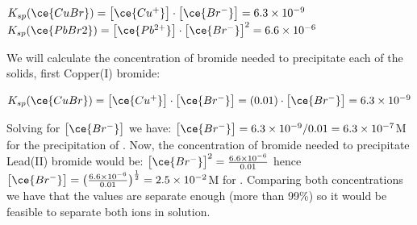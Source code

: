 \documentclass[main.tex]{subfiles}
\begin{document}
\begin{description}
\begin{center}
\hfill $K_{sp}(\ce{CuBr})= \big[ \ce{Cu^{+}} \big]\cdot \big[ \ce{Br^{-}} \big]=6.3\times 10^{-9}$\\
\hfill $K_{sp}(\ce{PbBr2})= \big[ \ce{Pb^{2+}} \big]\cdot \big[ \ce{Br^{-}} \big]^2=6.6\times 10^{-6}$
\end{center}
We will calculate the concentration of bromide needed to precipitate each of the solids, first Copper(I) bromide:
\begin{center}
$K_{sp}(\ce{CuBr})= \big[ \ce{Cu^{+}} \big]\cdot \big[ \ce{Br^{-}} \big]=(0.01)\cdot\big[ \ce{Br^{-}} \big]=6.3\times 10^{-9}$\\
\end{center}
Solving for $\big[ \ce{Br^{-}} \big]$ we have: $\big[ \ce{Br^{-}} \big]=6.3\times 10^{-9}/0.01=6.3\times 10^{-7}$M for the precipitation of . Now, the concentration of bromide needed to precipitate Lead(II) bromide would be:
$ \big[ \ce{Br^{-}} \big]^2=\frac{6.6\times 10^{-6}}{0.01}$ hence $ \big[ \ce{Br^{-}} \big]=\big(\frac{6.6\times 10^{-6}}{0.01}\big)^{\frac{1}{2}}=2.5\times 10^{-2}$M for . Comparing both concentrations we have that the values are separate enough (more than 99\%) so it would be feasible to separate both ions in solution.





\end{description}
\end{document}
